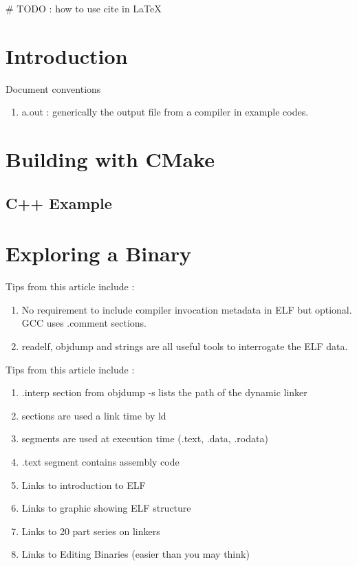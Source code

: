 
# TODO : how to use cite in LaTeX

\section{Introduction}

Document conventions

\begin{enumerate}
\item a.out : generically the output file from a compiler in example codes.
\end{enumerate}

\section{Building with CMake}

\subsection{C++ Example}

\cite{https://cmake.org/cmake-tutorial/}

\section{Exploring a Binary}

\cite{https://unix.stackexchange.com/questions/719/can-we-get-compiler-information-from-an-elf-binary}

Tips from this article include :

\begin{enumerate}
\item No requirement to include compiler invocation metadata in ELF but optional.  GCC uses .comment sections.
\item readelf, objdump and strings are all useful tools to interrogate the ELF data.
\end{enumerate}

\cite{https://jvns.ca/blog/2014/09/06/how-to-read-an-executable/}

Tips from this article include :

\begin{enumerate}
\item .interp section from objdump -s lists the path of the dynamic linker

\item sections are used a link time by ld
\item segments are used at execution time (.text, .data, .rodata)
\item .text segment contains assembly code
\item Links to introduction to ELF \cite{http://www.bottomupcs.com/elf.html}
\item Links to graphic showing ELF structure \cite{https://code.google.com/p/corkami/wiki/ELF101}
\item Links to 20 part series on linkers \cite{https://lwn.net/Articles/276782/}
\item Links to Editing Binaries (easier than you may think) \cite{https://danluu.com/edit-binary/}
\end{enumerate}


